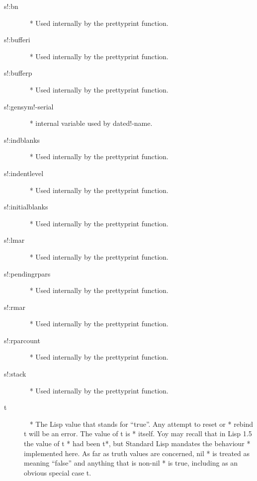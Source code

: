 \documentclass[a4paper,11pt]{article}
\begin{document}
\begin{description}
\item [{\ttfamily s!:bn}]  ~\newline
  * Used internally by the prettyprint function.

\item [{\ttfamily s!:bufferi}] ~\newline
  * Used internally by the prettyprint function.

\item [{\ttfamily s!:bufferp}] ~\newline
  * Used internally by the prettyprint function.

\item [{\ttfamily s!:gensym!-serial}]  ~\newline
  * internal variable used by {\ttfamily dated!-name}.

\item [{\ttfamily s!:indblanks}]  ~\newline
  * Used internally by the prettyprint function.

\item [{\ttfamily s!:indentlevel}] ~\newline
  * Used internally by the prettyprint function.

\item [{\ttfamily s!:initialblanks}] ~\newline
  * Used internally by the prettyprint function.

\item [{\ttfamily s!:lmar}] ~\newline
  * Used internally by the prettyprint function.

\item [{\ttfamily s!:pendingrpars}] ~\newline
  * Used internally by the prettyprint function.

\item [{\ttfamily s!:rmar}] ~\newline
  * Used internally by the prettyprint function.

\item [{\ttfamily s!:rparcount}] ~\newline
  * Used internally by the prettyprint function.

\item [{\ttfamily s!:stack}] ~\newline
  * Used internally by the prettyprint function.

\item [{\ttfamily t}]  ~\newline
  * The Lisp value that stands for ``true''. Any attempt to reset or
  * rebind {\ttfamily t} will be an error. The value of {\ttfamily t} is
  * itself. Yoy may recall that in Lisp 1.5 the value of {\ttfamily t}
  * had been {\ttfamily *t*}, but Standard Lisp mandates the behaviour
  * implemented here. As far as truth values are concerned, {\ttfamily nil}
  * is treated as meaning ``false'' and anything that is non-{\ttfamily nil}
  * is true, including as an obvious special case {\ttfamily t}.


\end{description}
\end{document}
